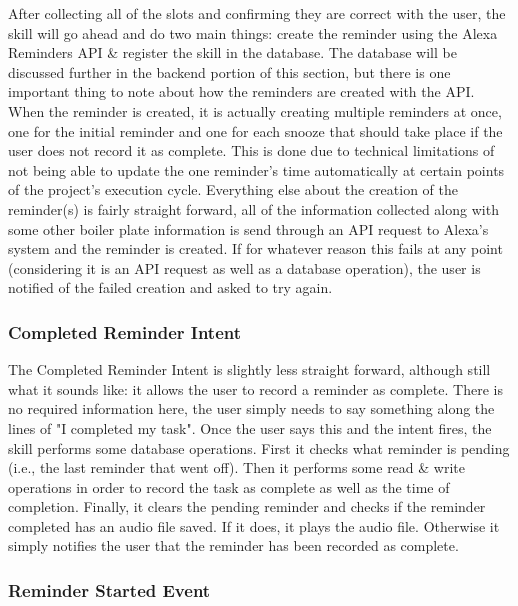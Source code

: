 \documentclass[conference]{IEEEtran}
\begin{document}
After collecting all of the slots and confirming they are correct with the user, the skill will go ahead and do two main things: create the reminder using the Alexa Reminders API \& register the skill in the database. 
The database will be discussed further in the backend portion of this section, but there is one important thing to note about how the reminders are created with the API. 
When the reminder is created, it is actually creating multiple reminders at once, one for the initial reminder and one for each snooze that should take place if the user does not record it as complete. 
This is done due to technical limitations of not being able to update the one reminder's time automatically at certain points of the project's execution cycle. 
Everything else about the creation of the reminder(s) is fairly straight forward, all of the information collected along with some other boiler plate information is send through an API request to Alexa's system and the reminder is created.
If for whatever reason this fails at any point (considering it is an API request as well as a database operation), the user is notified of the failed creation and asked to try again. 

\subsubsection{Completed Reminder Intent}

The Completed Reminder Intent is slightly less straight forward, although still what it sounds like: it allows the user to record a reminder as complete. 
There is no required information here, the user simply needs to say something along the lines of "I completed my task". 
Once the user says this and the intent fires, the skill performs some database operations. 
First it checks what reminder is pending (i.e., the last reminder that went off). 
Then it performs some read \& write operations in order to record the task as complete as well as the time of completion. 
Finally, it clears the pending reminder and checks if the reminder completed has an audio file saved. 
If it does, it plays the audio file. 
Otherwise it simply notifies the user that the reminder has been recorded as complete. 

\subsubsection{Reminder Started Event}
\end{document}
